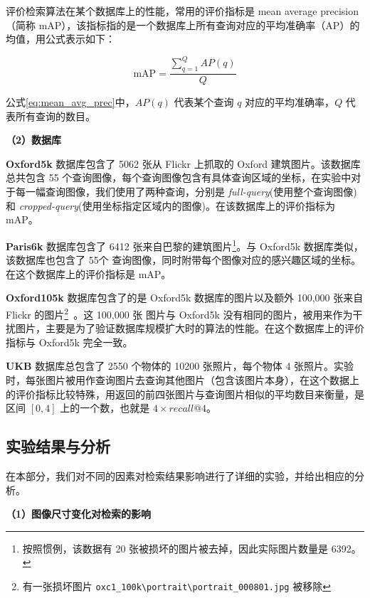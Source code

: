 评价检索算法在某个数据库上的性能，常用的评价指标是 mean average precision（简称 mAP），该指标指的是一个数据库上所有查询对应的平均准确率（AP）的均值，用公式表示如下：

\begin{equation}\label{eq:mean_avg_prec}
\text{mAP} = \frac{\sum_{q=1}^{Q}AP(q)}{Q}
\end{equation}

公式\ref{eq:mean_avg_prec}中，$AP(q)$ 代表某个查询 $q$ 对应的平均准确率，$Q$ 代表所有查询的数目。

\noindent\textbf{（2）数据库}

\textbf{Oxford5k} 数据库\cite{Philbin2007ObjectRW}包含了 5062 张从 Flickr 上抓取的 Oxford 建筑图片。该数据库总共包含 55 个查询图像，每个查询图像包含有具体查询区域的坐标，在实验中对于每一幅查询图像，我们使用了两种查询，分别是 \emph{full-query}(使用整个查询图像) 和 \emph{cropped-query}(使用坐标指定区域内的图像)。在该数据库上的评价指标为 mAP。

\textbf{Paris6k} 数据库\cite{Philbin2008LostIQ}包含了 6412 张来自巴黎的建筑图片\footnote{按照惯例，该数据有 20 张被损坏的图片被去掉，因此实际图片数量是 6392。}。与 Oxford5k 数据库类似，该数据库也包含了 55个 查询图像，同时附带每个图像对应的感兴趣区域的坐标。在这个数据库上的评价指标是 mAP。

\textbf{Oxford105k} 数据库包含了的是 Oxford5k 数据库的图片以及额外 100,000 张来自 Flickr 的图片\footnote{有一张损坏图片 \verb+oxc1_100k\portrait\portrait_000801.jpg+ 被移除}~\cite{Philbin2007ObjectRW}。这 100,000 张
图片与 Oxford5k 没有相同的图片，被用来作为干扰图片，主要是为了验证数据库规模扩大时的算法的性能。在这个数据库上的评价指标与 Oxford5k 完全一致。

\textbf{UKB} 数据库\cite{Nistr2006ScalableRW}总包含了 2550 个物体的 10200 张照片，每个物体 4 张照片。实验时，每张图片被用作查询图片去查询其他图片（包含该图片本身），在这个数据上的评价指标比较特殊，用返回的前四张图片与查询图片相似的平均数目来衡量，是区间 $[0,4]$ 上的一个数，也就是 $4\times recall@4$。

\subsection{实验结果与分析}
在本部分，我们对不同的因素对检索结果影响进行了详细的实验，并给出相应的分析。


\noindent\textbf{（1）图像尺寸变化对检索的影响}

